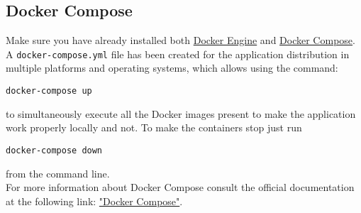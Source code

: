 \subsection{Docker Compose}
\label{sec:DockerCompose}
Make sure you have already installed both \href{https://docs.docker.com/install/}{Docker Engine} and \href{https://docs.docker.com/compose/install/}{Docker Compose}.\\
A \texttt{docker-compose.yml} file has been created for the application distribution in multiple platforms and operating systems, which allows using the command:
\begin{center}
\texttt{docker-compose up}
\end{center}
to simultaneously execute all the Docker images present to make the application work properly locally and not. To make the containers stop just run 
\begin{center}
\texttt{docker-compose down} 
\end{center} from the command line.\\
For more information about Docker Compose consult the official documentation at the following link: \href{https://docs.docker.com/compose/}{"Docker Compose"}. 

